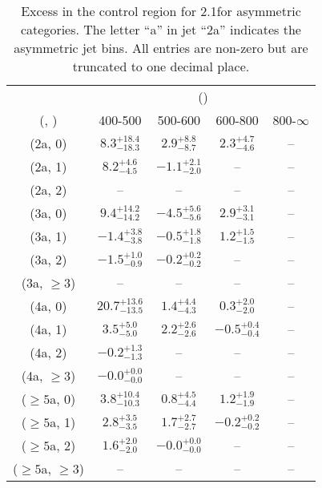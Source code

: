\begin{table}[h!]
\tiny
\centering
\caption{Excess in the \gj control region for 2.1\ifb for asymmetric categories. The letter ``a'' in jet \eg ``2a''  indicates the asymmetric jet bins. All entries are non-zero but are truncated to one decimal place.\label{tab:excesssepnaive_gj_ewk_asym}}
\begin{tabular}
{ccccc}
	\hline\hline
	& \multicolumn{4}{c}{\scalht (\gev)} \\ 
	 (\njet,  \nb) & 400-500 & 500-600 & 600-800 & 800-$\infty$ \\ [0.8ex] 
\hline
	(2a, 0) & $8.3^{+ 18.4 }_{- 18.3 }$ & $2.9^{+ 8.8 }_{- 8.7 }$ & $2.3^{+ 4.7 }_{- 4.6 }$ & -- \\[0.5ex] 
	(2a, 1) & $8.2^{+ 4.6 }_{- 4.5 }$ & $-1.1^{+ 2.1 }_{- 2.0 }$ & -- & -- \\[0.5ex] 
	(2a, 2) & -- & -- & -- & -- \\[0.5ex] 
	(3a, 0) & $9.4^{+ 14.2 }_{- 14.2 }$ & $-4.5^{+ 5.6 }_{- 5.6 }$ & $2.9^{+ 3.1 }_{- 3.1 }$ & -- \\[0.5ex] 
	(3a, 1) & $-1.4^{+ 3.8 }_{- 3.8 }$ & $-0.5^{+ 1.8 }_{- 1.8 }$ & $1.2^{+ 1.5 }_{- 1.5 }$ & -- \\[0.5ex] 
	(3a, 2) & $-1.5^{+ 1.0 }_{- 0.9 }$ & $-0.2^{+ 0.2 }_{- 0.2 }$ & -- & -- \\[0.5ex] 
	(3a, $\ge3$) & -- & -- & -- & -- \\[0.5ex] 
	(4a, 0) & $20.7^{+ 13.6 }_{- 13.5 }$ & $1.4^{+ 4.4 }_{- 4.3 }$ & $0.3^{+ 2.0 }_{- 2.0 }$ & -- \\[0.5ex] 
	(4a, 1) & $3.5^{+ 5.0 }_{- 5.0 }$ & $2.2^{+ 2.6 }_{- 2.6 }$ & $-0.5^{+ 0.4 }_{- 0.4 }$ & -- \\[0.5ex] 
	(4a, 2) & $-0.2^{+ 1.3 }_{- 1.3 }$ & -- & -- & -- \\[0.5ex] 
	(4a, $\ge3$) & $-0.0^{+ 0.0 }_{- 0.0 }$ & -- & -- & -- \\[0.5ex] 
	($\ge5$a, 0) & $3.8^{+ 10.4 }_{- 10.3 }$ & $0.8^{+ 4.5 }_{- 4.4 }$ & $1.2^{+ 1.9 }_{- 1.9 }$ & -- \\[0.5ex] 
	($\ge5$a, 1) & $2.8^{+ 3.5 }_{- 3.5 }$ & $1.7^{+ 2.7 }_{- 2.7 }$ & $-0.2^{+ 0.2 }_{- 0.2 }$ & -- \\[0.5ex] 
	($\ge5$a, 2) & $1.6^{+ 2.0 }_{- 2.0 }$ & $-0.0^{+ 0.0 }_{- 0.0 }$ & -- & -- \\[0.5ex] 
	($\ge5$a, $\ge3$) & -- & -- & -- & -- \\[0.5ex] 
	\hline
	\hline
\end{tabular}
\end{table}
